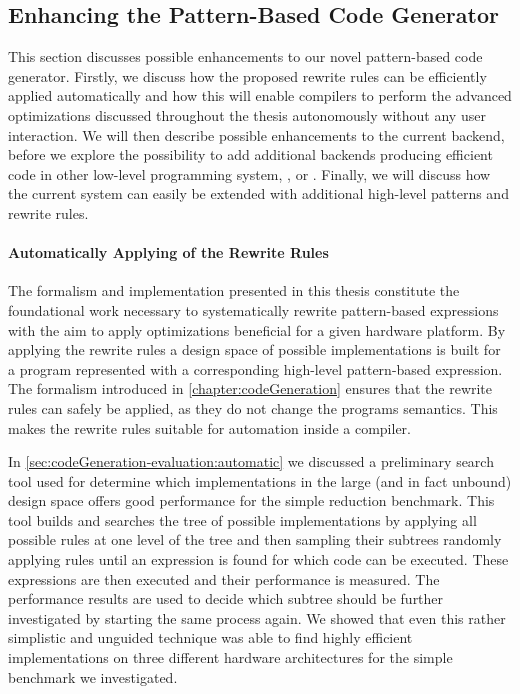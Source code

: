 \subsection{Enhancing the Pattern-Based Code Generator}
\label{section:future-work:codeGenerator}

This section discusses possible enhancements to our novel pattern-based code generator.
Firstly, we discuss how the proposed rewrite rules can be efficiently applied automatically and how this will enable compilers to perform the advanced optimizations discussed throughout the thesis autonomously without any user interaction.
We will then describe possible enhancements to the current \OpenCL backend, before we explore the possibility to add additional backends producing efficient code in other low-level programming system, \eg, \OpenMP or \MPI.
Finally, we will discuss how the current system can easily be extended with additional high-level patterns and rewrite rules.

\paragraph{Automatically Applying of the Rewrite Rules}
The formalism and implementation presented in this thesis constitute the foundational work necessary to systematically rewrite pattern-based expressions with the aim to apply optimizations beneficial for a given hardware platform.
By applying the rewrite rules a design space of possible implementations is built for a program represented with a corresponding high-level pattern-based expression.
The formalism introduced in \autoref{chapter:codeGeneration} ensures that the rewrite rules can safely be applied, as they do not change the programs semantics.
This makes the rewrite rules suitable for automation inside a compiler.

In \autoref{sec:codeGeneration-evaluation:automatic} we discussed a preliminary search tool used for determine which implementations in the large (and in fact unbound) design space offers good performance for the simple reduction benchmark.
This tool builds and searches the tree of possible implementations by applying all possible rules at one level of the tree and then sampling their subtrees randomly applying rules until an expression is found for which \OpenCL code can be executed.
These expressions are then executed and their performance is measured.
The performance results are used to decide which subtree should be further investigated by starting the same process again.
We showed that even this rather simplistic and unguided technique was able to find highly efficient implementations on three different hardware architectures for the simple benchmark we investigated.

